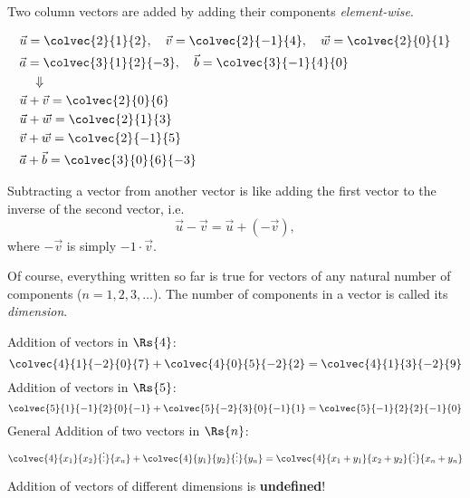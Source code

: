 Two column vectors are added by adding their components \emph{element-wise}.
\begin{example}
  \begin{align*}
  &\vec{u} = \colvec{2}{1}{2},\quad\vec{v} = \colvec{2}{-1}{4},\quad\vec{w}=\colvec{2}{0}{1}\\
  &\vec{a} = \colvec{3}{1}{2}{-3},\quad\vec{b} = \colvec{3}{-1}{4}{0}\\
  &\quad\Downarrow\\
  &\vec{u}+\vec{v} = \colvec{2}{0}{6}\\
  &\vec{u}+\vec{w} = \colvec{2}{1}{3}\\
  &\vec{v}+\vec{w} = \colvec{2}{-1}{5}\\
  &\vec{a}+\vec{b} = \colvec{3}{0}{6}{-3}\\
  \end{align*}
\end{example}
\begin{warning}
  Subtracting a vector from another vector is like adding the first vector to the inverse of the second vector, i.e.
  \begin{equation*}
  \vec{u}-\vec{v} = \vec{u} + (-\vec{v}),
  \end{equation*}
  where $-\vec{v}$ is simply $-1\cdot\vec{v}$.
\end{warning}

Of course, everything written so far is true for vectors of any natural number of components ($n=1,2,3,\dots$). The number of components in a vector is called its \emph{dimension}.
\begin{example}
  Addition of vectors in $\Rs{4}$:
  \begin{equation*}
  \colvec{4}{1}{-2}{0}{7} + \colvec{4}{0}{5}{-2}{2} = \colvec{4}{1}{3}{-2}{9}
  \end{equation*}
  Addition of vectors in $\Rs{5}$:
  \begin{equation*}
  \colvec{5}{1}{-1}{2}{0}{-1} + \colvec{5}{-2}{3}{0}{-1}{1} = \colvec{5}{-1}{2}{2}{-1}{0}
  \end{equation*}
  General Addition of two vectors in $\Rs{n}$:
  \begin{equation*}
  \colvec{4}{x_{1}}{x_{2}}{\vdots}{x_{n}} + \colvec{4}{y_{1}}{y_{2}}{\vdots}{y_{n}} = \colvec{4}{x_{1}+y_{1}}{x_{2}+y_{2}}{\vdots}{x_{n}+y_{n}}
  \end{equation*}
\end{example}
\begin{warning}
  Addition of vectors of different dimensions is \textbf{undefined}!
\end{warning}


